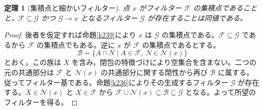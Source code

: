 \documentclass[a5paper,10pt,dvipdfmx]{jsarticle}
\theoremstyle{definition}
\theoremstyle{plain}
\newtheorem{thm}[ruledef]{定理}
\begin{document}
\begin{thm}[集積点と細かいフィルター]\label{k240}
点 $x$ がフィルター $\mathcal F$ の集積点であることと，$\mathcal F\subseteq\mathcal G$ かつ $\mathcal G\to x$ となるフィルター $\mathcal G$ が存在することは同値である。
\end{thm}
\begin{proof}
後者を仮定すれば命題\ref{k239}により $x$ は $\mathcal G$ の集積点である。$\mathcal F\subseteq\mathcal G$ であるから $\mathcal F$ の集積点でもある。逆に $x$ が $\mathcal F$ の集積点であるとする。
\[
 \mathcal B=\{A\cap N\mid A\in\mathcal F,\ N\in\mathcal N(x)\}
\]
とおく。この族は $X$ を含み，閉包の特徴づけにより空集合を含まない。二つの元の共通部分は $\mathcal F$ と $\mathcal N(x)$ の共通部分に関する閉性から再び $\mathcal B$ に属する。従ってフィルター基である。命題\ref{k236}によりその生成するフィルター $\mathcal G$ が存在する。$X\in\mathcal N(x)$ と $X\in\mathcal F$ から $\mathcal F\cup\mathcal N(x)\subseteq\mathcal B\subseteq\mathcal G$ となる。よって所望のフィルターを得る。
\end{proof}

\end{document}
